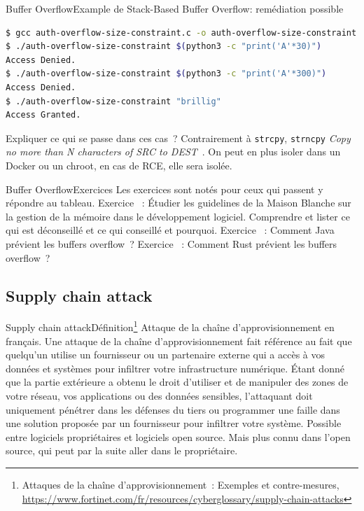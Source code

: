\documentclass{beamer}
\begin{document}
    \begin{frame}[fragile]{Buffer Overflow}{Example de Stack-Based Buffer Overflow: remédiation possible}
        \begin{lstlisting}[language=bash]
$ gcc auth-overflow-size-constraint.c -o auth-overflow-size-constraint
$ ./auth-overflow-size-constraint $(python3 -c "print('A'*30)")
Access Denied.
$ ./auth-overflow-size-constraint $(python3 -c "print('A'*300)")
Access Denied.
$ ./auth-overflow-size-constraint "brillig"
Access Granted.
        \end{lstlisting}
        Expliquer ce qui se passe dans ces cas~?
        \pause
        \bigbreak
        Contrairement à \lstinline{strcpy}, \lstinline{strncpy} \textit{Copy no more than N characters of SRC to DEST}~.
        \bigbreak
        On peut en plus isoler dans un Docker ou un chroot, en cas de RCE, elle sera isolée.
    \end{frame}

    \begin{frame}{Buffer Overflow}{Exercices}
        Les exercices sont notés pour ceux qui passent y répondre au tableau.
        \bigbreak
        Exercice \execcounterdispinc{}~:
        Étudier les guidelines de la Maison Blanche sur la gestion de la mémoire dans le développement logiciel.
        \bigbreak
        Comprendre et lister ce qui est déconseillé et ce qui conseillé et pourquoi.
        Exercice \execcounterdispinc{}~:
        Comment Java prévient les buffers overflow~?
        \bigbreak
        Exercice \execcounterdispinc{}~:
        Comment Rust prévient les buffers overflow~?
    \end{frame}

    \subsection{Supply chain attack}\label{subsec:supply-chain-attack}
    \begin{frame}{Supply chain attack}{Définition\footnote{Attaques de la chaîne d’approvisionnement~: Exemples et contre-mesures, \url{https://www.fortinet.com/fr/resources/cyberglossary/supply-chain-attacks}}}
        Attaque de la chaîne d'approvisionnement en français.
        \bigbreak
        Une attaque de la chaîne d’approvisionnement fait référence au fait que quelqu’un utilise un fournisseur ou un partenaire externe qui a accès à vos données et systèmes pour infiltrer votre infrastructure numérique.
        Étant donné que la partie extérieure a obtenu le droit d’utiliser et de manipuler des zones de votre réseau, vos applications ou des données sensibles, l’attaquant doit uniquement pénétrer dans les défenses du tiers ou programmer une faille dans une solution proposée par un fournisseur pour infiltrer votre système.
        \bigbreak
        Possible entre logiciels propriétaires et logiciels open source.
        Mais plus connu dans l'open source, qui peut par la suite aller dans le propriétaire.
    \end{frame}
\end{document}
